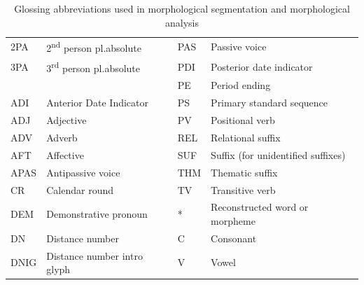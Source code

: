 \documentclass[../main.tex]{subfiles}
\begin{document}
\begin{table}[!ht]
\begin{tabular}{llll}
        2PA            & 2\textsuperscript{nd} person pl.absolute         & PAS            & Passive voice \\                        
        3PA            & 3\textsuperscript{rd} person pl.absolute         & PDI            & Posterior date indicator \\
                       &                                                  & PE             & Period ending \\
        ADI            & Anterior Date Indicator                          & PS             & Primary standard sequence \\
        ADJ            & Adjective                                        & PV             & Positional verb \\         
        ADV            & Adverb                                           & REL            & Relational suffix \\             
        AFT            & Affective                                        & SUF            & Suffix (for unidentified suffixes) \\
        APAS           & Antipassive voice                                & THM            & Thematic suffix \\        
        CR             & Calendar round                                   & TV             & Transitive verb \\     
        DEM            & Demonstrative pronoun                            & *              & Reconstructed word or morpheme \\
        DN             & Distance number                                  & C              & Consonant \\
        DNIG           & Distance number intro glyph                      & V              & Vowel  
    \end{tabular} 
    \caption{Glossing abbreviations used in morphological segmentation and morphological analysis}
    \label{table:terminology-glossing-abbreviations}
\end{table}
\end{document}
